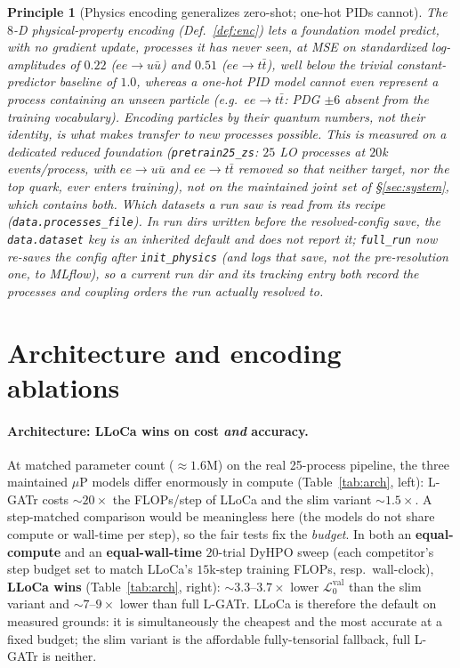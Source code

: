 \documentclass[11pt]{article}
\newcommand{\vlnr}{\mathcal{L}^{\mathrm{val}}_{0}}   %
\newcommand{\code}[1]{\texttt{#1}}
\newtheorem{principle}{Principle}
\begin{document}
\begin{principle}[Physics encoding generalizes zero-shot; one-hot PIDs cannot]\label{prin:zeroshot}
The $8$-D physical-property encoding (Def.~\ref{def:enc}) lets a foundation model predict, with no
gradient update, processes it has never seen, at MSE on standardized log-amplitudes of $0.22$
($ee\to u\bar u$) and $0.51$ ($ee\to t\bar t$), well below
the trivial constant-predictor baseline of $1.0$, whereas a one-hot PID model
\emph{cannot even represent} a process containing an unseen particle (e.g.\ $ee\to t\bar t$: PDG
$\pm6$ absent from the training vocabulary). Encoding particles by their quantum numbers, not their
identity, is what makes transfer to new processes possible. This is measured on a \emph{dedicated
reduced} foundation (\code{pretrain25\_zs}: $25$ LO processes at $20$k events/process, with
$ee\to u\bar u$ and $ee\to t\bar t$ removed so that neither target, nor the top quark, ever
enters training), \emph{not} on the maintained joint set of \S\ref{sec:system}, which contains
both. Which datasets a run saw is read from its recipe (\code{data.processes\_file}). In run dirs
written before the resolved-config save, the \code{data.dataset} key is an inherited default and
does \emph{not} report it; \code{full\_run} now re-saves the config after \code{init\_physics} (and
logs that save, not the pre-resolution one, to MLflow), so a current run dir and its tracking entry
both record the processes and coupling orders the run actually resolved to.
\end{principle}

\section{Architecture and encoding ablations}\label{sec:arch}

\paragraph{Architecture: LLoCa wins on cost \emph{and} accuracy.} At matched parameter count
($\approx1.6$M) on the real 25-process pipeline, the three maintained $\mu$P models differ
enormously in compute (Table~\ref{tab:arch}, left): L-GATr costs $\sim\!20\times$ the FLOPs/step
of LLoCa and the slim variant $\sim\!1.5\times$. A step-matched comparison would be meaningless
here (the models do not share compute or wall-time per step), so the fair tests fix the
\emph{budget}. In both an \textbf{equal-compute} and an \textbf{equal-wall-time} $20$-trial DyHPO
sweep (each competitor's step budget set to match LLoCa's $15$k-step training FLOPs, resp.\
wall-clock), \textbf{LLoCa wins} (Table~\ref{tab:arch}, right): $\sim\!3.3$--$3.7\times$ lower
$\vlnr$ than the slim variant and $\sim\!7$--$9\times$ lower than full L-GATr. LLoCa is therefore
the default on measured grounds: it is simultaneously the cheapest and the most accurate
at a fixed budget; the slim variant is the affordable fully-tensorial fallback, full L-GATr is
neither.
\end{document}
